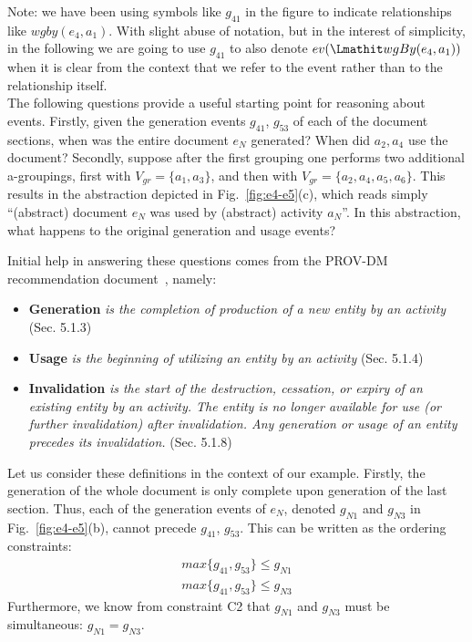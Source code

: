 Note: we have been using symbols like $g_{41}$ in the figure to indicate relationships like $wgby(e_4, a_1)$. 
With slight abuse of notation, but in the interest of simplicity, in the following we are going to use $g_{41}$ to also denote $ev(\wgby(e_4, a_1))$ when it is clear from the context that we refer to the event rather than to the relationship itself.
\\

The following questions provide a useful starting point for reasoning about events. Firstly, given the generation events $g_{41}$, $g_{53}$  of each of the document sections, when was the entire document $e_N$ generated? 
%
When did $a_2, a_4$ use the document? 
%
Secondly,  suppose after the first grouping one performs two additional a-groupings, first with $V_{gr} = \{a_1, a_3\}$, and then with $V_{gr} = \{a_2, a_4, a_5, a_6\}$.
%
 This results in the abstraction depicted in Fig.~\ref{fig:e4-e5}(c), which reads simply ``(abstract) document $e_N$ was used by (abstract) activity $a_N$''. 
 In this abstraction, what happens to the original generation and usage events?

Initial help in answering these questions comes from the PROV-DM recommendation document~\citep{w3c-prov-dm}, namely:
\begin{itemize}
\item\textbf{Generation} \textit{is the completion of production of a new entity by an activity} (Sec. 5.1.3)
\item\textbf{Usage} \textit{is the beginning of utilizing an entity by an activity} (Sec. 5.1.4)
\item\textbf{Invalidation} \textit{is the start of the destruction, cessation, or expiry of an existing entity by an activity. The entity is no longer available for use (or further invalidation) after invalidation. Any generation or usage of an entity precedes its invalidation.} (Sec. 5.1.8)
\end{itemize}

%
Let us consider these definitions in the context of our example. Firstly, the generation of the whole document is only complete upon generation of the last section. Thus, each of the generation events of $e_N$, denoted $g_{N1}$ and $g_{N3}$ in Fig.~\ref{fig:e4-e5}(b), cannot precede $g_{41}$, $g_{53}$. This can be written as the ordering constraints:
\begin{align}
 \label{eq:gprime-order1}
max\{g_{41}, g_{53}\} \leq g_{N1} \\
max\{g_{41}, g_{53}\}  \leq g_{N3}
\end{align}
Furthermore, we know from constraint C2 that $g_{N1}$ and $g_{N3}$ must be simultaneous:
$g_{N1} = g_{N3}$.


